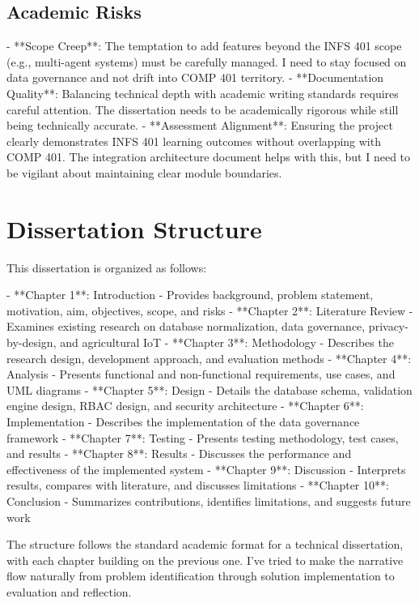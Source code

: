 \subsection{Academic Risks}
- **Scope Creep**: The temptation to add features beyond the INFS 401 scope (e.g., multi-agent systems) must be carefully managed. I need to stay focused on data governance and not drift into COMP 401 territory.
- **Documentation Quality**: Balancing technical depth with academic writing standards requires careful attention. The dissertation needs to be academically rigorous while still being technically accurate.
- **Assessment Alignment**: Ensuring the project clearly demonstrates INFS 401 learning outcomes without overlapping with COMP 401. The integration architecture document helps with this, but I need to be vigilant about maintaining clear module boundaries.

\section{Dissertation Structure}

This dissertation is organized as follows:

- **Chapter 1**: Introduction - Provides background, problem statement, motivation, aim, objectives, scope, and risks
- **Chapter 2**: Literature Review - Examines existing research on database normalization, data governance, privacy-by-design, and agricultural IoT
- **Chapter 3**: Methodology - Describes the research design, development approach, and evaluation methods
- **Chapter 4**: Analysis - Presents functional and non-functional requirements, use cases, and UML diagrams
- **Chapter 5**: Design - Details the database schema, validation engine design, RBAC design, and security architecture
- **Chapter 6**: Implementation - Describes the implementation of the data governance framework
- **Chapter 7**: Testing - Presents testing methodology, test cases, and results
- **Chapter 8**: Results - Discusses the performance and effectiveness of the implemented system
- **Chapter 9**: Discussion - Interprets results, compares with literature, and discusses limitations
- **Chapter 10**: Conclusion - Summarizes contributions, identifies limitations, and suggests future work

The structure follows the standard academic format for a technical dissertation, with each chapter building on the previous one. I've tried to make the narrative flow naturally from problem identification through solution implementation to evaluation and reflection.
